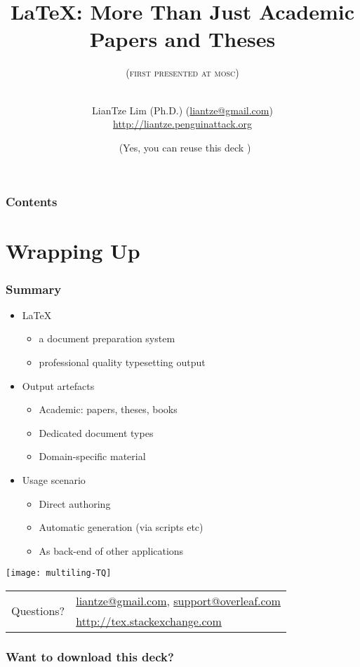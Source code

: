 \documentclass[xcolor={x11names,svgnames,dvipsnames},trans]{beamer}
\author[LianTze Lim (Ph.D.)]{\texorpdfstring{LianTze Lim (Ph.D.)
(\url{liantze@gmail.com})\\\url{http://liantze.penguinattack.org}}{LianTze Lim (Ph.D.)}}
\title{\LaTeX: More Than Just Academic Papers and Theses}
\subtitle{\texorpdfstring{(\textsc{first presented at mosc}\oldstylenums{2011})\\%
\hrulefill\ \adforn{57}\thickspace\wb{m}\thickspace\adforn{29}\ \hrulefill}{First Presented at MOSC 2011; some modifications since}}
\date[\ccbyncsa]{\ccbyncsa\ (Yes, you can reuse this deck \Smiley)}
\begin{document}
\begin{frame}[plain]
\maketitle
\end{frame}

\begin{frame}
\frametitle{Contents}
\tableofcontents
\end{frame}






\section{Wrapping Up}

\begin{frame}
\frametitle{Summary}
\begin{itemize}
\item<+-> \LaTeX
    \begin {itemize}
    \item a document preparation system
    \item professional quality typesetting output
    \end{itemize}
\item<+-> Output artefacts
    \begin{itemize}
    \item Academic: papers, theses, books
    \item Dedicated document types
    \item Domain-specific material
    \end{itemize}
\item<+-> Usage scenario
    \begin{itemize}
    \item Direct authoring
    \item Automatic generation (via scripts etc)
    \item As back-end of other applications
    \end{itemize}
\end{itemize}
\end{frame}

\begin{frame}
\centering
\texttt{[image: multiling-TQ]}

\bigskip 
\begin{tabular}{cl}
\multirow{2}{*}{\huge Questions?} & \url{liantze@gmail.com}, \url{support@overleaf.com}\\
& \url{http://tex.stackexchange.com}\\
\end{tabular}

\end{frame}

\begin{frame}
\frametitle{Want to download this deck?}
\centering
{}
\end{frame}
\end{document}

